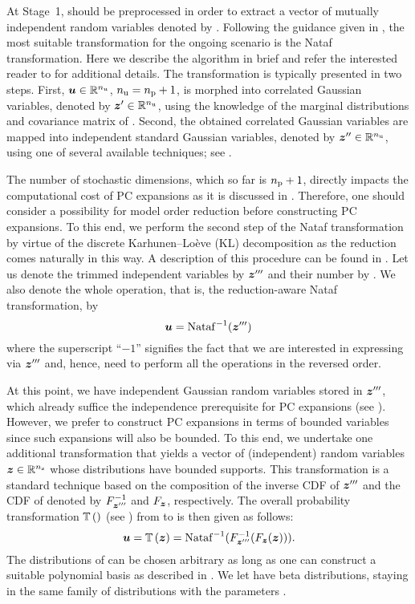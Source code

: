 At Stage~1, \vu should be preprocessed in order to extract a vector of mutually
independent random variables denoted by \vz. Following the guidance given in
, the most suitable transformation for the ongoing
scenario is the Nataf transformation. Here we describe the algorithm in brief
and refer the interested reader to \cite{li2008} for additional details. The
transformation is typically presented in two steps. First, $\boldsymbol{u} \in \mathbb{R}^{n_\mathrm{u}}$,
${n_\mathrm{u}} = {n_\mathrm{p}} + 1$, is morphed into correlated Gaussian variables, denoted by $\boldsymbol{z}'
\in \mathbb{R}^{n_\mathrm{u}}$, using the knowledge of the marginal distributions and covariance
matrix of \vu. Second, the obtained correlated Gaussian variables are mapped
into independent standard Gaussian variables, denoted by $\boldsymbol{z}'' \in \mathbb{R}^{n_\mathrm{u}}$,
using one of several available techniques; see \cite{li2008}.

The number of stochastic dimensions, which so far is ${n_\mathrm{p}}+ 1$, directly impacts
the computational cost of PC expansions as it is discussed in
. Therefore, one should consider a possibility
for model order reduction before constructing PC expansions. To this end, we
perform the second step of the Nataf transformation by virtue of the discrete
Karhunen--Lo\`{e}ve (KL) decomposition \cite{ghanem1991} as the reduction comes
naturally in this way. A description of this procedure can be found in
. Let us denote the trimmed independent variables by
$\boldsymbol{z}'''$ and their number by \nz. We also denote the whole operation, that is,
the reduction-aware Nataf transformation, by
\[
  \boldsymbol{u} = \mathrm{Nataf}^{-1}(\boldsymbol{z}''')
\]
where the superscript ``$-1$'' signifies the fact that we are interested in
expressing \vu via $\boldsymbol{z}'''$ and, hence, need to perform all the operations in
the reversed order.

At this point, we have \nz independent Gaussian random variables stored in
$\boldsymbol{z}'''$, which already suffice the independence prerequisite for PC expansions
(see ). However, we prefer to construct PC expansions
in terms of bounded variables since such expansions will also be bounded. To
this end, we undertake one additional transformation that yields a vector of
(independent) random variables $\boldsymbol{z} \in \mathbb{R}^{n_\mathrm{z}}$ whose distributions have
bounded supports. This transformation is a standard technique based on the
composition of the inverse CDF of $\boldsymbol{z}'''$ and the CDF of \vz denoted by
$F^{-1}_{\boldsymbol{z}'''}$ and $F_{\boldsymbol{z}}$, respectively. The overall probability
transformation $\mathbb{T}\left(\right)$ (see ) from \vu to \vz
is then given as follows:
\[
  \boldsymbol{u} = \mathbb{T}\left(\boldsymbol{z}\right) = \mathrm{Nataf}^{-1}(F^{-1}_{\boldsymbol{z}'''}(F_{\boldsymbol{z}}(\boldsymbol{z}))).
\]
The distributions of \vz can be chosen arbitrary as long as one can construct a
suitable polynomial basis as described in . We let \vz have beta
distributions, staying in the same family of distributions with the parameters
\vu.

